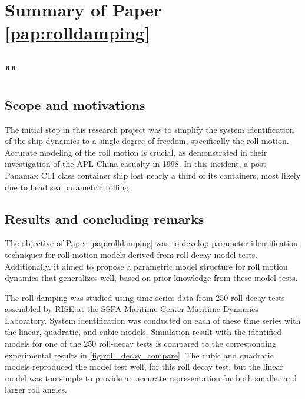 \section{Summary of Paper \ref{pap:rolldamping}}
\subsection*{""}
\subsection*{Scope and motivations}
The initial step in this research project was to simplify the system identification of the ship dynamics to a single degree of freedom, specifically the roll motion. Accurate modeling of the roll motion is crucial, as \textcite{franceInvestigationHeadSeaParametric2001} demonstrated in their investigation of the APL China casualty in 1998. In this incident, a post-Panamax C11 class container ship lost nearly a third of its containers, most likely due to head sea parametric rolling.

\subsection*{Results and concluding remarks}
The objective of Paper \ref{pap:rolldamping} was to develop parameter identification techniques for roll motion models derived from roll decay model tests. Additionally, it aimed to propose a parametric model structure for roll motion dynamics that generalizes well, based on prior knowledge from these model tests.

The roll damping was studied using time series data from 250 roll decay tests assembled by RISE at the SSPA Maritime Center Maritime Dynamics Laboratory.
System identification was conducted on each of these time series with the linear, quadratic, and cubic models. Simulation result with the identified models for one of the 250 roll-decay tests is compared to the corresponding experimental results in \autoref{fig:roll_decay_compare}. The cubic and quadratic models reproduced the model test well, for this roll decay test, but the linear model was too simple to provide an accurate representation for both smaller and larger roll angles.

